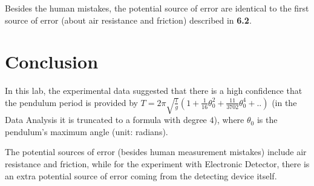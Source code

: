 \documentclass{article}
\begin{document}
Besides the human mistakes, the potential source of error are identical to the first source of error (about air resistance and friction) described in \textbf{6.2}.

\hfil

\section{Conclusion}
In this lab, the experimental data suggested that there is a high confidence that the pendulum period is provided by $T=2\pi\sqrt{\frac{l}{g}}\left(1+\frac{1}{16}\theta_0^2+\frac{11}{3702}\theta_0^4+..\right)$ (in the Data Analysis it is truncated to a formula with degree $4$), where $\theta_0$ is the pendulum's maximum angle (unit: radians).

The potential sources of error (besides human measurement mistakes) include air resistance and friction, while for the experiment with Electronic Detector, there is an extra potential source of error coming from the detecting device itself.
\end{document}
